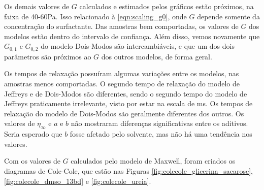 		Os demais valores de \(G\) calculados e estimados pelos gráficos estão próximos, na faixa de 40-60Pa. Isso relacionado à \autoref{eqn:scaling_g0}, onde \(G\) depende somente da concentração do surfactante. Das amostras bem comportadas, os valores de \(G\) dos modelos estão dentro do intervalo de confiança. Além disso, vemos novamente que \(G_{0,1}\) e \(G_{0,2}\) do modelo Dois-Modos são intercambiáveis, e que um dos dois parâmetros são próximos ao \(G\) dos outros modelos, de forma geral.
		
		Os tempos de relaxação possuíram algumas variações entre os modelos, nas amostras menos comportadas. O segundo tempo de relaxação do modelo de Jeffreys e de Dois-Modos são diferentes, sendo o segundo tempo do modelo de Jeffreys praticamente irrelevante, visto por estar na escala de ms. Os tempos de relaxação do modelo de Dois-Modos são geralmente diferentes dos outros. Os valores de \(\eta_{\infty}\) e \(a\) e \(b\) não mostraram diferenças significativas entre os aditivos. Seria esperado que \(b\) fosse afetado pelo solvente, mas não há uma tendência nos valores.
		
		Com os valores de \(G\) calculados pelo modelo de Maxwell, foram criados os diagramas de Cole-Cole, que estão nas Figuras \ref{fig:colecole_glicerina_sacarose}, \ref{fig:colecole_dmso_13bd} e \ref{fig:colecole_ureia}.
		
